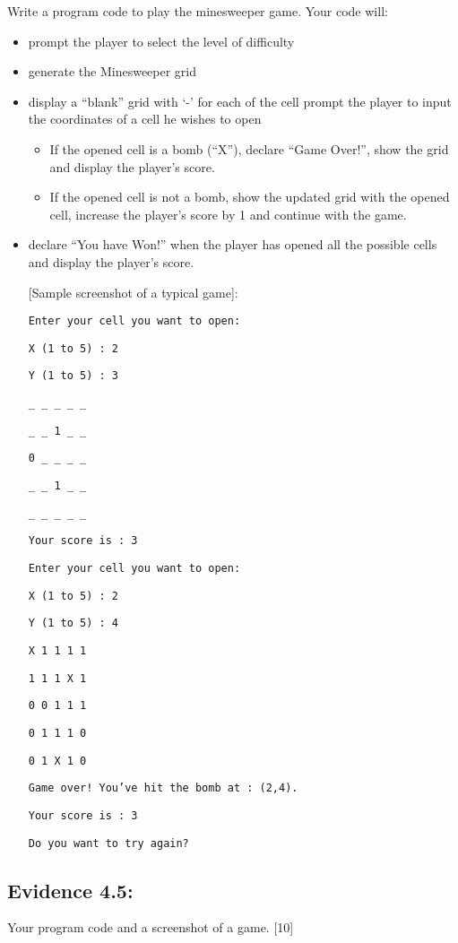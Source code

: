 Write a program code to play the minesweeper game. Your code will:
\begin{itemize}
\item prompt the player to select the level of difficulty
\item generate the Minesweeper grid 
\item display a \textquotedblleft blank\textquotedblright{} grid with \textquoteleft -\textquoteright{}
for each of the cell prompt the player to input the coordinates of
a cell he wishes to open 
\begin{itemize}
\item If the opened cell is a bomb (\textquotedblleft X\textquotedblright ),
declare \textquotedblleft Game Over!\textquotedblright , show the
grid and display the player\textquoteright s score.
\item If the opened cell is not a bomb, show the updated grid with the opened
cell, increase the player\textquoteright s score by 1 and continue
with the game.
\end{itemize}
\item declare \textquotedblleft You have Won!\textquotedblright{} when the
player has opened all the possible cells and display the player\textquoteright s
score. 

{[}Sample screenshot of a typical game{]}: 

\noindent %
\begin{minipage}[t]{0.5\columnwidth}%
\texttt{Enter your cell you want to open:}

\texttt{X (1 to 5) : 2}

\texttt{Y (1 to 5) : 3}

\texttt{\_ \_ \_ \_ \_}

\texttt{\_ \_ 1 \_ \_}

\texttt{0 \_ \_ \_ \_}

\texttt{\_ \_ 1 \_ \_}

\texttt{\_ \_ \_ \_ \_}

\texttt{Your score is : 3}%
\end{minipage}%
\begin{minipage}[t]{0.5\columnwidth}%
\texttt{Enter your cell you want to open:}

\texttt{X (1 to 5) : 2}

\texttt{Y (1 to 5) : 4}

\texttt{X 1 1 1 1}

\texttt{1 1 1 X 1}

\texttt{0 0 1 1 1}

\texttt{0 1 1 1 0}

\texttt{0 1 X 1 0}

\texttt{Game over! You've hit the bomb at : (2,4).}

\texttt{Your score is : 3}

\texttt{Do you want to try again?}%
\end{minipage}
\end{itemize}

\subsection*{Evidence 4.5:}

Your program code and a screenshot of a game. \hfill{}{[}10{]}